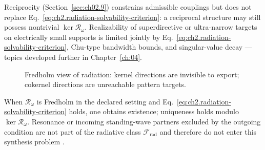 Reciprocity (Section~\ref{sec:ch02.9}) constrains admissible couplings but does not replace Eq.~\eqref{eq:ch2.radiation-solvability-criterion}: a reciprocal structure may still possess nontrivial $\ker\mathcal{R}_\omega$. Realizability of superdirective or ultra-narrow targets on electrically small supports is limited jointly by Eq.~\eqref{eq:ch2.radiation-solvability-criterion}, Chu-type bandwidth bounds, and singular-value decay \cite{chu1948,harrington2001}---topics developed further in Chapter~\ref{ch:04}.

\begin{figure}[t]
\centering
{}
\caption{Fredholm view of radiation: kernel directions are invisible to export; cokernel directions are unreachable pattern targets.}
\label{fig:ch2.fredholm-radiation-chain}
\end{figure}

When $\mathcal{R}_\omega$ is Fredholm in the declared setting and Eq.~\eqref{eq:ch2.radiation-solvability-criterion} holds, one obtains existence; uniqueness holds modulo $\ker\mathcal{R}_\omega$. Resonance or incoming standing-wave partners excluded by the outgoing condition are not part of the radiative class $\mathcal{F}_{\mathrm{rad}}$ and therefore do not enter this synthesis problem \cite{stratton1941}.
